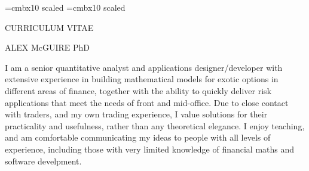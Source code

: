 \font\titlesize=cmbx10 scaled
\font\namesize=cmbx10 scaled
\vsize=10in
\hsize=8in
\voffset -0.4in
\hoffset -0.9in
\vskip 1cm
\centerline{\titlesize CURRICULUM VITAE}
\vskip 0.4in
\centerline{\namesize ALEX McGUIRE PhD}
\vskip 0.2in
\def\jobskip{\noalign{\bigskip}}
\def\posskip{\noalign{\medskip}}
\midinsert
\narrower\narrower\narrower
\noindent I am a senior quantitative analyst and applications designer/developer with extensive experience in building mathematical models for exotic options in 
different areas of finance, together with the ability to quickly deliver risk applications that meet the needs of front and mid-office. Due to close contact with traders, and my own trading experience, I value
solutions for their practicality and usefulness, rather than any theoretical elegance. I enjoy teaching, and am comfortable communicating my ideas to people with all
levels of experience, including those with very limited knowledge of financial maths and software develpment.
\endinsert


